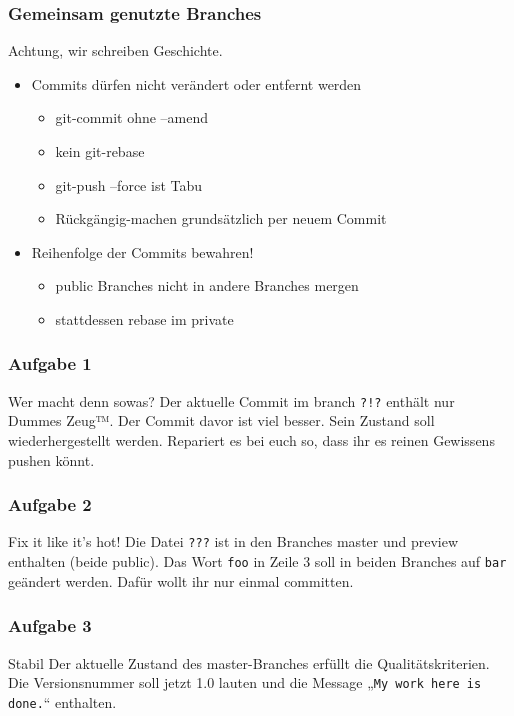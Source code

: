 \documentclass{beamer}
\begin{document}
\begin{frame}
	\frametitle{Gemeinsam genutzte Branches}
	\begin{block}{Achtung, wir schreiben Geschichte.}
		\begin{itemize}
			\item Commits dürfen nicht verändert oder entfernt werden
				\begin{itemize}
					\item git-commit ohne --amend
					\item kein git-rebase
					\item git-push --force ist Tabu
					\item Rückgängig-machen grundsätzlich per neuem Commit
				\end{itemize}
			\item Reihenfolge der Commits bewahren!
				\begin{itemize}
					\item public Branches nicht in andere Branches mergen
					\item stattdessen rebase im private
				\end{itemize}
		\end{itemize}
	\end{block}
\end{frame}

\begin{frame}
	\frametitle{Aufgabe 1}
	\begin{block}{Wer macht denn sowas?}
		Der aktuelle Commit im branch \texttt{?!?} enthält nur Dummes Zeug™.
		Der Commit davor ist viel besser.
		Sein Zustand soll wiederhergestellt werden.
		Repariert es bei euch so, dass ihr es reinen Gewissens pushen könnt.
	\end{block}
\end{frame}

\begin{frame}
	\frametitle{Aufgabe 2}
	\begin{block}{Fix it like it’s hot!}
		Die Datei \texttt{???} ist in den Branches master und preview enthalten (beide public).
		Das Wort \texttt{foo} in Zeile 3 soll in beiden Branches auf \texttt{bar} geändert werden.
		Dafür wollt ihr nur einmal committen.
	\end{block}
\end{frame}

\begin{frame}
	\frametitle{Aufgabe 3}
	\begin{block}{Stabil}
		Der aktuelle Zustand des master-Branches erfüllt die Qualitätskriterien.
		Die Versionsnummer soll jetzt 1.0 lauten und die Message „\texttt{My work here is done.}“ enthalten.
	\end{block}
\end{frame}
\end{document}

